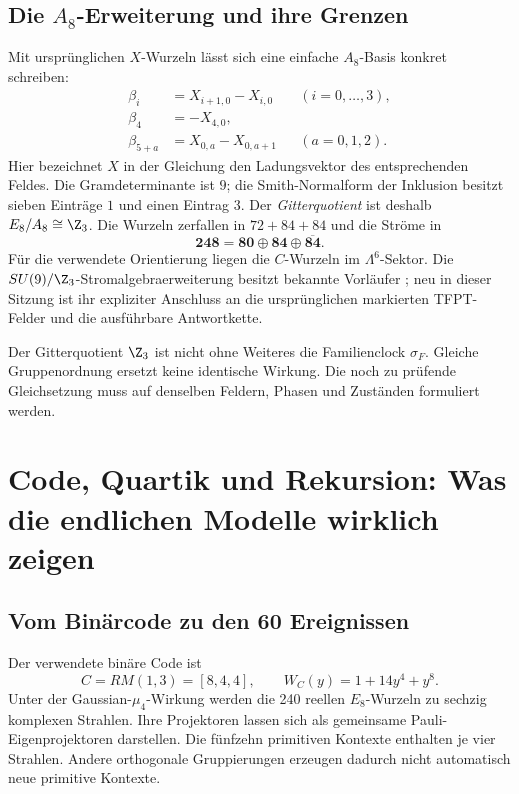 \subsection{Die $A_8$-Erweiterung und ihre Grenzen}
Mit ursprünglichen $X$-Wurzeln lässt sich eine einfache $A_8$-Basis konkret schreiben:
\begin{align}
\beta_i&=X_{i+1,0}-X_{i,0} &&(i=0,\ldots,3),\\
\beta_4&=-X_{4,0},\\
\beta_{5+a}&=X_{0,a}-X_{0,a+1} &&(a=0,1,2).
\end{align}
Hier bezeichnet $X$ in der Gleichung den Ladungsvektor des entsprechenden Feldes. Die Gramdeterminante ist $9$; die Smith-Normalform der Inklusion besitzt sieben Einträge $1$ und einen Eintrag $3$. Der \emph{Gitterquotient} ist deshalb $E_8/A_8\cong\Z_3$. Die Wurzeln zerfallen in $72+84+84$ und die Ströme in
\begin{equation}
\mathbf{248}=\mathbf{80}\oplus\mathbf{84}\oplus\overline{\mathbf{84}}.
\end{equation}
Für die verwendete Orientierung liegen die $C$-Wurzeln im $\Lambda^6$-Sektor. Die $SU(9)/\Z_3$-Stromalgebraerweiterung besitzt bekannte Vorläufer \cite{distler}; neu in dieser Sitzung ist ihr expliziter Anschluss an die ursprünglichen markierten TFPT-Felder und die ausführbare Antwortkette.

Der Gitterquotient $\Z_3$ ist nicht ohne Weiteres die Familienclock $\sigma_F$. Gleiche Gruppenordnung ersetzt keine identische Wirkung. Die noch zu prüfende Gleichsetzung muss auf denselben Feldern, Phasen und Zuständen formuliert werden.

\section{Code, Quartik und Rekursion: Was die endlichen Modelle wirklich zeigen}\label{sec:finite}

\subsection{Vom Binärcode zu den 60 Ereignissen}
Der verwendete binäre Code ist
\begin{equation}
C=RM(1,3)=[8,4,4],\qquad W_C(y)=1+14y^4+y^8.
\end{equation}
Unter der Gaussian-$\mu_4$-Wirkung werden die 240 reellen $E_8$-Wurzeln zu sechzig komplexen Strahlen. Ihre Projektoren lassen sich als gemeinsame Pauli-Eigenprojektoren darstellen. Die fünfzehn primitiven Kontexte enthalten je vier Strahlen. Andere orthogonale Gruppierungen erzeugen dadurch nicht automatisch neue primitive Kontexte.

